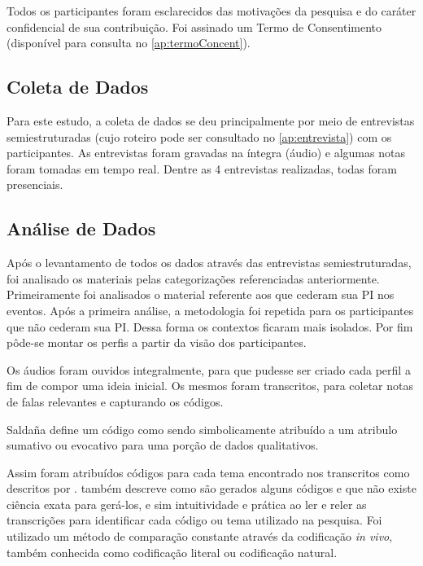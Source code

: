 Todos os participantes foram esclarecidos das motivações da pesquisa e do caráter confidencial de sua contribuição. Foi assinado um Termo de Consentimento (disponível para consulta no \autoref{ap:termoConcent}).


\subsection{Coleta de Dados}

Para este estudo, a coleta de dados se deu principalmente por meio de entrevistas semiestruturadas (cujo roteiro pode ser consultado no \autoref{ap:entrevista}) com os participantes. As entrevistas foram gravadas na íntegra (áudio) e algumas notas foram tomadas em tempo real. Dentre as 4 entrevistas realizadas, todas foram presenciais.


\subsection{Análise de Dados}


Após o levantamento de todos os dados através das entrevistas semiestruturadas, foi analisado os materiais pelas categorizações referenciadas anteriormente. Primeiramente foi analisados o material referente aos que cederam sua PI nos eventos. Após a primeira análise, a metodologia foi repetida para os participantes que não cederam sua PI. Dessa forma os contextos ficaram mais isolados. Por fim pôde-se montar os perfis a partir da visão dos participantes.

Os áudios foram ouvidos integralmente, para que pudesse ser criado cada perfil a fim de compor uma ideia inicial. Os mesmos foram transcritos, para coletar notas de falas relevantes e capturando os códigos. \citep{saldana2011fundamentals}

Saldaña define um código como sendo simbolicamente atribuído a um atribulo sumativo ou evocativo para uma porção de dados qualitativos. \citep{saldana2011fundamentals}

Assim foram atribuídos códigos para cada tema encontrado nos transcritos como descritos por \citet{lakatos2017tecnicas}. \citet{saldana2015coding} também descreve como são gerados alguns códigos e que não existe ciência exata para gerá-los, e sim intuitividade e prática ao ler e reler as transcrições para identificar cada código ou tema utilizado na pesquisa. Foi utilizado um método de comparação constante através da codificação \textit{in vivo}, também conhecida como codificação literal ou codificação natural. \citet{saldana2015coding}

